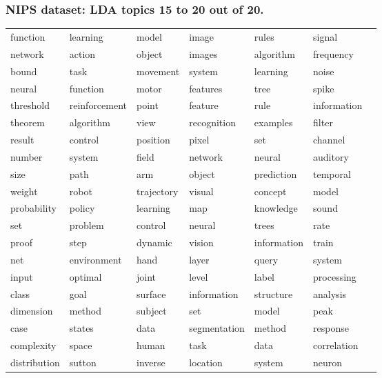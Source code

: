 \begin{frame}
\frametitle{NIPS dataset: LDA topics 15 to 20 out of 20.}

{\scriptsize
\begin{tabular}{l l l l l l l} 
function & learning & model & image & rules & signal\\ 
network & action & object & images & algorithm & frequency\\ 
bound & task & movement & system & learning & noise\\ 
neural & function & motor & features & tree & spike\\ 
threshold & reinforcement & point & feature & rule & information\\ 
theorem & algorithm & view & recognition & examples & filter\\ 
result & control & position & pixel & set & channel\\ 
number & system & field & network & neural & auditory\\ 
size & path & arm & object & prediction & temporal\\ 
weight & robot & trajectory & visual & concept & model\\ 
probability & policy & learning & map & knowledge & sound\\ 
set & problem & control & neural & trees & rate\\ 
proof & step & dynamic & vision & information & train\\ 
net & environment & hand & layer & query & system\\ 
input & optimal & joint & level & label & processing\\ 
class & goal & surface & information & structure & analysis\\ 
dimension & method & subject & set & model & peak\\ 
case & states & data & segmentation & method & response\\ 
complexity & space & human & task & data & correlation\\ 
distribution & sutton & inverse & location & system & neuron
\end{tabular}
}

\end{frame}


